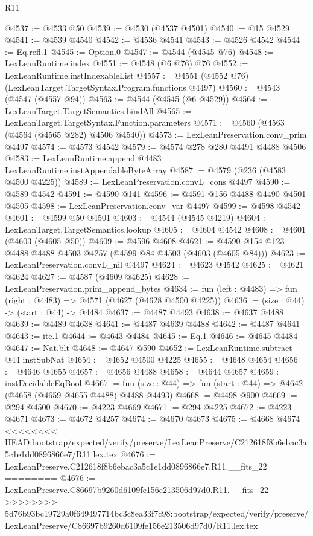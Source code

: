 \begin{lexlean}{R11}
\begin{coremodule}
{{{{{{{{{{{{{{{{{{{{{{{{{{{{{{{{{{{{{{{{{{{{{{{{{{{{{{{{{{{{{{{{{{{{{{{{{{{{{{{{{{{{{{{{{{{{{{{{{{{{{{{{{{@4537 := @4533 @50
@4539 := @4530 (@4537 @4501)
@4540 := @15 @4529
@4541 := @4539 @4540
@4542 := @4536 @4541
@4543 := @4526 @4542
@4544 := Eq.refl.{1}
@4545 := Option.{0}
@4547 := @4544 (@4545 @76)
@4548 := LexLeanRuntime.index
@4551 := @4548 (@6 @76) @76
@4552 := LexLeanRuntime.instIndexableList
@4557 := @4551 (@4552 @76) (LexLeanTarget.TargetSyntax.Program.functions @4497)
@4560 := @4543 (@4547 (@4557 @94))
@4563 := @4544 (@4545 (@6 @4529))
@4564 := LexLeanTarget.TargetSemantics.bindAll
@4565 := LexLeanTarget.TargetSyntax.Function.parameters
@4571 := @4560 (@4563 (@4564 (@4565 @282) @4506 @4540))
@4573 := LexLeanPreservation.conv_prim @4497
@4574 := @4573 @4542
@4579 := @4574 @278 @280 @4491 @4488 @4506
@4583 := LexLeanRuntime.append @4483 LexLeanRuntime.instAppendableByteArray
@4587 := @4579 (@236 (@4583 @4500 @4225))
@4589 := LexLeanPreservation.convL_cons @4497
@4590 := @4589 @4542
@4591 := @4590 @141
@4596 := @4591 @156 @4488 @4490 @4501 @4505
@4598 := LexLeanPreservation.conv_var @4497
@4599 := @4598 @4542
@4601 := @4599 @50 @4501
@4603 := @4544 (@4545 @4219)
@4604 := LexLeanTarget.TargetSemantics.lookup
@4605 := @4604 @4542
@4608 := @4601 (@4603 (@4605 @50))
@4609 := @4596 @4608
@4621 := @4590 @154 @123 @4488 @4488 @4503 @4257 (@4599 @84 @4503 (@4603 (@4605 @84)))
@4623 := LexLeanPreservation.convL_nil @4497
@4624 := @4623 @4542
@4625 := @4621 @4624
@4627 := @4587 (@4609 @4625)
@4628 := LexLeanPreservation.prim_append_bytes
@4634 := fun (left : @4483) => fun (right : @4483) => @4571 (@4627 (@4628 @4500 @4225))
@4636 := (size : @44) -> (start : @44) -> @4484
@4637 := @4487 @4493
@4638 := @4637 @4488
@4639 := @4489 @4638
@4641 := @4487 @4639 @4488
@4642 := @4487 @4641
@4643 := ite.{1}
@4644 := @4643 @4484
@4645 := Eq.{1}
@4646 := @4645 @4484
@4647 := Nat.blt
@4648 := @4647 @590
@4652 := LexLeanRuntime.subtract @44 instSubNat
@4654 := @4652 @4500 @4225
@4655 := @4648 @4654
@4656 := @4646 @4655
@4657 := @4656 @4488
@4658 := @4644 @4657
@4659 := instDecidableEqBool
@4667 := fun (size : @44) => fun (start : @44) => @4642 (@4658 (@4659 @4655 @4488) @4488 @4493)
@4668 := @4498 @900
@4669 := @294 @4500
@4670 := @4223 @4669
@4671 := @294 @4225
@4672 := @4223 @4671
@4673 := @4672 @4257
@4674 := @4670 @4673
@4675 := @4668 @4674
<<<<<<<< HEAD:bootstrap/expected/verify/preserve/LexLeanPreserve/C212618f8b6ebac3a5c1e1dd0896866e7/R11.lex.tex
@4676 := LexLeanPreserve.C212618f8b6ebac3a5c1e1dd0896866e7.R11.__fits_22
========
@4676 := LexLeanPreserve.C86697b9260d6109fe156e213506d97d0.R11.__fits_22
>>>>>>>> 5d76b93bc19729a0f649497714bc3c8ea33f7c98:bootstrap/expected/verify/preserve/LexLeanPreserve/C86697b9260d6109fe156e213506d97d0/R11.lex.tex
}}}}}}}}}}}}}}}}}}}}}}}}}}}}}}}}}}}}}}}}}}}}}}}}}}}}}}}}}}}}}}}}}}}}}}}}}}}}}}}}}}}}}}}}}}}}}}}}}}}}}}}}}}
\end{coremodule}
\end{lexlean}
